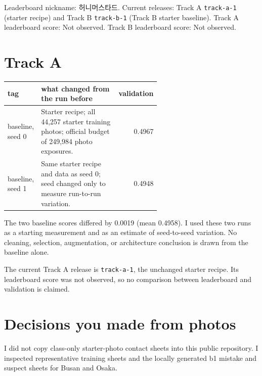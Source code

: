 \documentclass[11pt]{article}
\begin{document}
\makeheader

Leaderboard nickname: 허니머스타드. Current releases: Track A \texttt{track-a-1} (starter recipe) and Track B \texttt{track-b-1} (Track B starter baseline). Track A leaderboard score: Not observed. Track B leaderboard score: Not observed.


\section*{Track A}

\begin{center}\footnotesize
\begin{tabular}{lp{0.6\linewidth}r}
\toprule
tag & what changed from the run before & validation \\
\midrule
baseline, seed 0 & Starter recipe; all 44,257 starter training photos; official budget of 249,984 photo exposures. & 0.4967 \\
baseline, seed 1 & Same starter recipe and data as seed 0; seed changed only to measure run-to-run variation. & 0.4948 \\
\bottomrule
\end{tabular}
\end{center}

The two baseline scores differed by 0.0019 (mean 0.4958). I used these two runs as a starting measurement and as an estimate of seed-to-seed variation. No cleaning, selection, augmentation, or architecture conclusion is drawn from the baseline alone.

The current Track A release is \texttt{track-a-1}, the unchanged starter recipe. Its leaderboard score was not observed, so no comparison between leaderboard and validation is claimed.

\section*{Decisions you made from photos}

I did not copy class-only starter-photo contact sheets into this public repository. I inspected representative training sheets and the locally generated b1 mistake and suspect sheets for Busan and Osaka.
\end{document}
